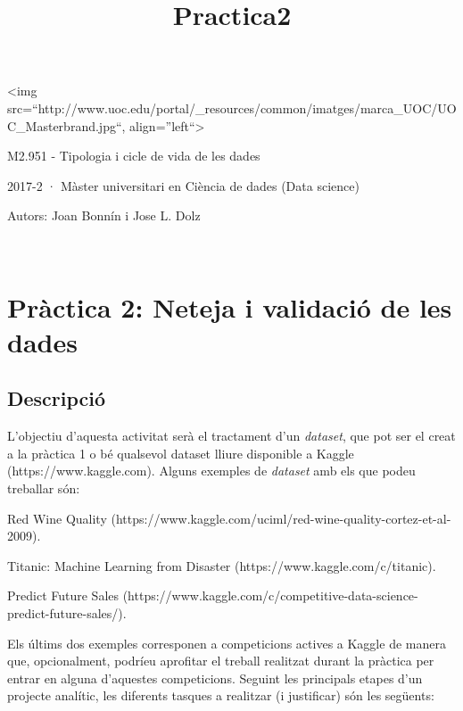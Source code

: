 \documentclass[11pt]{article}
\title{Practica2}
\begin{document}
    
    
    \maketitle
    
    

    
    \textless{}img
src=``http://www.uoc.edu/portal/\_resources/common/imatges/marca\_UOC/UOC\_Masterbrand.jpg``,
align=''left``\textgreater{}

M2.951 - Tipologia i cicle de vida de les dades

2017-2 · Màster universitari en Ciència de dades (Data science)

Autors: Joan Bonnín i Jose L. Dolz

~

\hypertarget{pruxe0ctica-2-neteja-i-validaciuxf3-de-les-dades}{%
\section{Pràctica 2: Neteja i validació de les
dades}\label{pruxe0ctica-2-neteja-i-validaciuxf3-de-les-dades}}

    \hypertarget{descripciuxf3}{%
\subsection{Descripció}\label{descripciuxf3}}

L'objectiu d'aquesta activitat serà el tractament d'un \emph{dataset},
que pot ser el creat a la pràctica 1 o bé qualsevol dataset lliure
disponible a Kaggle (https://www.kaggle.com). Alguns exemples de
\emph{dataset} amb els que podeu treballar són:

Red Wine Quality
(https://www.kaggle.com/uciml/red-wine-quality-cortez-et-al-2009).

Titanic: Machine Learning from Disaster
(https://www.kaggle.com/c/titanic).

Predict Future Sales
(https://www.kaggle.com/c/competitive-data-science-predict-future-sales/).

Els últims dos exemples corresponen a competicions actives a Kaggle de
manera que, opcionalment, podríeu aprofitar el treball realitzat durant
la pràctica per entrar en alguna d'aquestes competicions. Seguint les
principals etapes d'un projecte analític, les diferents tasques a
realitzar (i justificar) són les següents:
\end{document}
